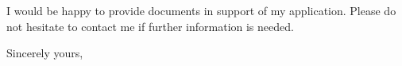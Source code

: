 \documentclass[11pt]{letter} %
\begin{document}
\begin{letter}{}
\begin{itemize}
\end{itemize}

I would be happy to provide documents in support of my application. Please do not hesitate to contact me if further information is needed. 

\closing{Sincerely yours,}




\end{letter}
\end{document}
